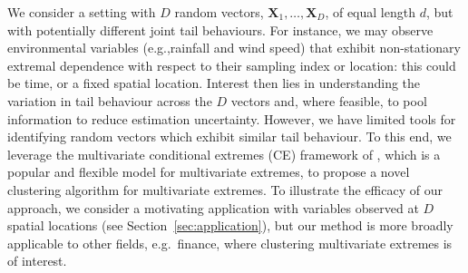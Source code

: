 \documentclass[12pt,compact]{article}
\begin{document}
We consider a setting with $D$ random vectors, $\symbf{X}_1, \ldots, \symbf{X}_D$, of equal length $d$, but with potentially different joint tail behaviours. 
For instance, we may observe environmental variables (e.g.,\@ rainfall and wind speed) that exhibit non-stationary extremal dependence with respect to their sampling index or location: this could be time, or a fixed spatial location. 
Interest then lies in understanding the variation in tail behaviour across the $D$ vectors and, where feasible, to pool information to reduce estimation uncertainty. 
However, we have limited tools for identifying random vectors which exhibit similar tail behaviour.
To this end, we leverage the multivariate conditional extremes (CE) framework of \citet{Heffernan2004}, which is a popular and flexible model for multivariate extremes, to propose a novel clustering algorithm for multivariate extremes.
To illustrate the efficacy of our approach, we consider a motivating application with variables observed at $D$ spatial locations (see Section~\ref{sec:application}), but our method is more broadly applicable to other fields, e.g.\ finance, where clustering multivariate extremes is of interest. 
\end{document}
